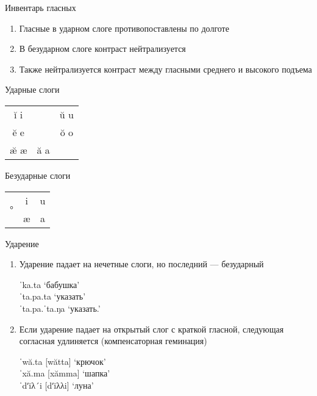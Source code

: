 \documentclass[10 pt, handout]{beamer}
\begin{document}
\begin{frame}{Инвентарь гласных}

	\begin{enumerate}[\ding{102}]
		\item Гласные в ударном слоге противопоставлены по долготе
		\item В безударном слоге контраст нейтрализуется
		\item Также нейтрализуется контраст между гласными среднего и высокого подъема
	\end{enumerate}
	
	\vfill
	
\begin{minipage}{.45\textwidth}
\centering
Ударные слоги

\begin{table}[H]
\begin{tabular}{ccc}
ĭ i  &  &  ŭ u   \\
ĕ e  &    & ŏ o \\
æ̆ æ & ă a &    
\end{tabular}
\end{table}
\end{minipage}
\begin{minipage}{.5\textwidth}
\centering
Безударные слоги

\begin{table}[H]
\begin{tabular}{ccc}
\multirow{2}{*}{°} & i & u \\
                   & æ & a
\end{tabular}
\end{table}
\end{minipage}


\end{frame}

\begin{frame}{Ударение}

	\begin{enumerate}[\ding{87}]
		\item Ударение падает на нечетные слоги, но последний --- безударный
		
	\ex	ˈka.ta \hfill `бабушка'\\
		ˈta.pa.ta \hfill `указать'\\
		ˈta.pa.ˈta.ŋa \hfill `указать.{\Gfs}'	
	\xe
		
		\item Если ударение падает на открытый слог с краткой гласной, следующая согласная удлиняется (компенсаторная геминация)		

	\ex	ˈwă.ta [wătta] \hfill `крючок'\\
		ˈxă.ma [xămma] \hfill `шапка'\\
		ˈdʹĭλ´i [dʹĭλλi] \hfill `луна'
	\xe
	\end{enumerate}

\end{frame}
\end{document}
